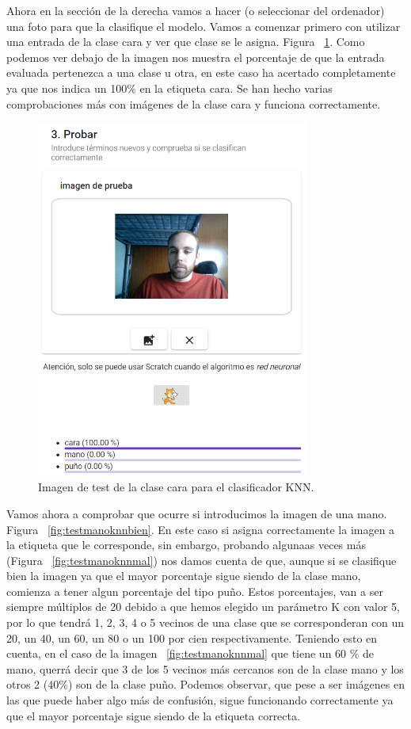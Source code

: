 \documentclass[a4paper, 12pt]{book}
\begin{document}
Ahora en la sección de la derecha vamos a hacer (o seleccionar del ordenador) una foto para que la clasifique el modelo. Vamos a comenzar primero con utilizar una entrada de la clase cara y ver que clase se le asigna. Figura ~\ref{fig:testcaraknn}. Como podemos ver debajo de la imagen nos muestra el porcentaje de que la entrada evaluada pertenezca a una clase u otra, en este caso ha acertado completamente ya que nos indica un 100\% en la etiqueta cara. Se han hecho varias comprobaciones más con imágenes de la clase cara y funciona correctamente.

\begin{figure}
	\centering
	\includegraphics[width=9cm, keepaspectratio]{img/testcaraknn}
	\caption{Imagen de test de la clase cara para el clasificador KNN.}			
	\label{fig:testcaraknn}
\end{figure}

Vamos ahora a comprobar que ocurre si introducimos la imagen de una mano. Figura ~\ref{fig:testmanoknnbien}. En este caso si asigna correctamente la imagen a la etiqueta que le corresponde, sin embargo, probando algunaas veces más (Figura ~\ref{fig:testmanoknnmal}) nos damos cuenta de que, aunque si se clasifique bien la imagen ya que el mayor porcentaje sigue siendo de la clase mano, comienza a tener algun porcentaje del tipo puño. Estos porcentajes, van a ser siempre múltiplos de 20 debido a que hemos elegido un parámetro K con valor 5, por lo que tendrá 1, 2, 3, 4 o 5 vecinos de una clase que se corresponderan con un 20, un 40, un 60, un 80 o un 100 por cien respectivamente. Teniendo esto en cuenta, en el caso de la imagen  ~\ref{fig:testmanoknnmal} que tiene un 60 \% de mano, querrá decir que 3 de los 5 vecinos más cercanos son de la clase mano y los otros 2 (40\%) son de la clase puño. Podemos observar, que pese a ser imágenes en las que puede haber algo más de confusión, sigue funcionando correctamente ya que el mayor porcentaje sigue siendo de la etiqueta correcta.
\end{document}
